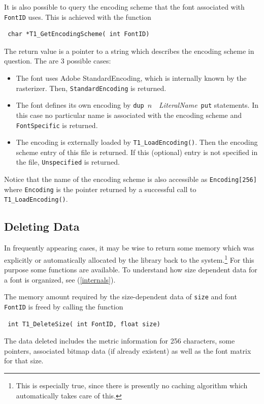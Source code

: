 It is also possible to query the encoding scheme that the font associated with
\verb+FontID+ uses. This is achieved with the function
\precorr
\begin{verbatim}
 char *T1_GetEncodingScheme( int FontID)
\end{verbatim}\postcorr
The return value is a pointer to a string which describes the encoding scheme
in question. The are 3 possible cases:
\begin{itemize}
\item The font uses Adobe StandardEncoding, which is internally known by the
  rasterizer. Then, \verb+StandardEncoding+ is returned.
\item The font defines its own encoding by \hbox{\verb+dup+ $n$ {\em
      LiteralName} \verb+put+} statements. In this case no particular name is
  associated with the encoding scheme and \verb+FontSpecific+ is returned.
\item The encoding is externally loaded by \verb+T1_LoadEncoding()+. Then the
  encoding scheme entry of this file is returned. If this (optional) entry is
  not specified in the file, \verb+Unspecified+ is returned.
\end{itemize}
Notice that the name of the encoding scheme is also accessible as
\verb+Encoding[256]+ where \verb+Encoding+ is the pointer returned by a
successful call to \verb+T1_LoadEncoding()+.

\subsection{Deleting Data}
\label{deletingdata}%
In frequently appearing cases, it may be wise to return some memory
which was explicitly 
or automatically allocated by the library back to the
system.\footnote{This is especially true, since there is presently no
  caching algorithm which automatically takes care of this.} For
this purpose 
some functions are available. To understand how size dependent
data for a font is organized, see (\ref{internals}).

The memory amount required by the size-dependent data of \verb+size+
and font \verb+FontID+ is freed by calling the function 
\precorr
\begin{verbatim}
 int T1_DeleteSize( int FontID, float size)
\end{verbatim}\postcorr
The data deleted includes the metric
information for 256 characters, some pointers, associated bitmap data (if
already existent) as well as the font matrix for that size.

